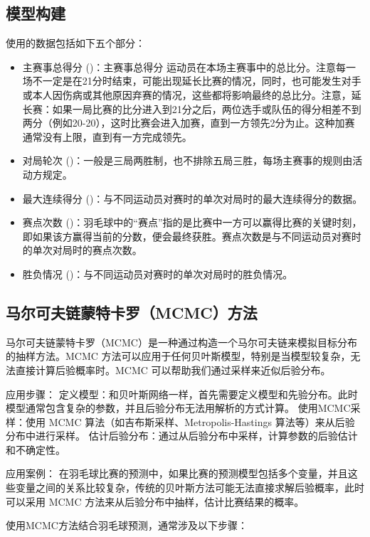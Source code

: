 \documentclass[12pt]{article}
\begin{document}
\subsection{模型构建}
使用的数据包括如下五个部分：
\begin{itemize}
	\item 主赛事总得分 ()：主赛事总得分    运动员在本场主赛事中的总比分。注意每一场不一定是在21分时结束，可能出现延长比赛的情况，同时，也可能发生对手或本人因伤病或其他原因弃赛的情况，这些都将影响最终的总比分。注意，延长赛：如果一局比赛的比分进入到21分之后，两位选手或队伍的得分相差不到两分（例如20-20），这时比赛会进入加赛，直到一方领先2分为止。这种加赛通常没有上限，直到有一方完成领先。
	\item 对局轮次 ()：一般是三局两胜制，也不排除五局三胜，每场主赛事的规则由活动方规定。
	\item 最大连续得分 ()：与不同运动员对赛时的单次对局时的最大连续得分的数据。
	\item 赛点次数 ()：羽毛球中的“赛点”指的是比赛中一方可以赢得比赛的关键时刻，即如果该方赢得当前的分数，便会最终获胜。赛点次数是与不同运动员对赛时的单次对局时的赛点次数。
	\item 胜负情况 ()：与不同运动员对赛时的单次对局时的胜负情况。
	\end{itemize}


\subsection{马尔可夫链蒙特卡罗（MCMC）方法}



马尔可夫链蒙特卡罗（MCMC）是一种通过构造一个马尔可夫链来模拟目标分布的抽样方法。MCMC 方法可以应用于任何贝叶斯模型，特别是当模型较复杂，无法直接计算后验概率时。MCMC 可以帮助我们通过采样来近似后验分布。

应用步骤：
定义模型：和贝叶斯网络一样，首先需要定义模型和先验分布。此时模型通常包含复杂的参数，并且后验分布无法用解析的方式计算。
使用MCMC采样：使用 MCMC 算法（如吉布斯采样、Metropolis-Hastings 算法等）来从后验分布中进行采样。
估计后验分布：通过从后验分布中采样，计算参数的后验估计和不确定性。

应用案例：
在羽毛球比赛的预测中，如果比赛的预测模型包括多个变量，并且这些变量之间的关系比较复杂，传统的贝叶斯方法可能无法直接求解后验概率，此时可以采用 MCMC 方法来从后验分布中抽样，估计比赛结果的概率。

使用MCMC方法结合羽毛球预测，通常涉及以下步骤：
\end{document}
